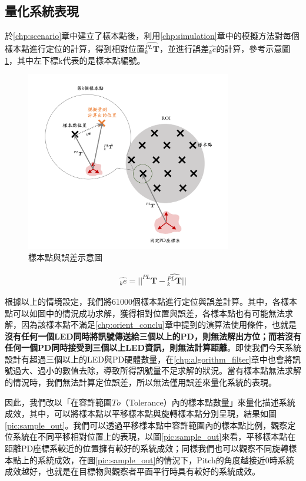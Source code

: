 \subsection{量化系統表現}
\label{chp:evaluate_method}

於\ref{chp:scenario}章中建立了樣本點後，利用\ref{chp:simulation}章中的模擬方法對每個樣本點進行定位的計算，得到相對位置$\hat{_k^{PL}\boldsymbol{T}}$，並進行誤差$\hat{_k e}$的計算，參考示意圖\ref{pic:error_show}，其中左下標k代表的是樣本點編號。

\begin{figure}[htpb]
    \centering
    \includegraphics[width=9cm]{ch4pic/error.png}
    \caption{樣本點與誤差示意圖}
    \label{pic:error_show}
\end{figure}

\begin{gather}
    \label{eqn:sample_error}
    \hat{_k e} = ||^{PL}\boldsymbol{T}-\hat{^{PL}_k\boldsymbol{T}}||
\end{gather}



根據以上的情境設定，我們將61000個樣本點進行定位與誤差計算。其中，各樣本點可以如圖中的情況成功求解，獲得相對位置與誤差，各樣本點也有可能無法求解，因為該樣本點不滿足\ref{chp:orient_conclu}章中提到的演算法使用條件，也就是\textbf{沒有任何一個LED同時將訊號傳送給三個以上的PD，則無法解出方位；而若沒有任何一個PD同時接受到三個以上LED資訊，則無法計算距離}。即使我們今天系統設計有超過三個以上的LED與PD硬體數量，在\ref{chp:algorithm_filter}章中也會將訊號過大、過小的數值去除，導致所得訊號量不足求解的狀況。當有樣本點無法求解的情況時，我們無法計算定位誤差，所以無法僅用誤差來量化系統的表現。



因此，我們改以「在容許範圍$To$（Tolerance）內的樣本點數量」來量化描述系統成效，其中，可以將樣本點以平移樣本點與旋轉樣本點分別呈現，結果如圖\ref{pic:sample_out}。我們可以透過平移樣本點中容許範圍內的樣本點比例，觀察定位系統在不同平移相對位置上的表現，以圖\ref{pic:sample_out}來看，平移樣本點在距離PD座標系較近的位置擁有較好的系統成效；同樣我們也可以觀察不同旋轉樣本點上的系統成效，在圖\ref{pic:sample_out}的情況下，Pitch的角度越接近0時系統成效越好，也就是在目標物與觀察者平面平行時具有較好的系統成效。

